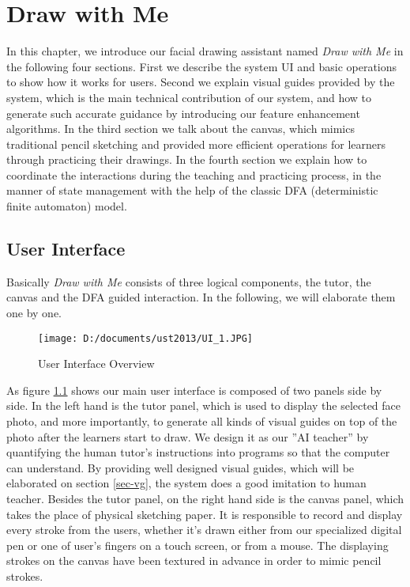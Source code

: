 \chapter{Draw with Me} \label{sec-mainwork}

		In this chapter, we introduce our facial drawing assistant named  \textit{Draw with Me}  in the following four sections. First we describe the system UI and basic operations to show how it works for users. Second we explain visual guides provided by the system, which is the main technical contribution of our system, and how to generate such accurate guidance by introducing our feature enhancement algorithms. In the third section we talk about the canvas, which mimics traditional pencil sketching and provided more efficient operations for learners through practicing their drawings. In the fourth section we explain how to coordinate the interactions during the teaching and practicing process, in the manner of state management with the help of the classic DFA (deterministic finite automaton) model.

\section{User Interface}

		Basically \textit{Draw with Me} consists of three logical components, the tutor, the canvas and the DFA guided interaction. In the following, we will elaborate them one by one. 
	
		\begin{figure}[htbp]
			\centering
				\texttt{[image: D:/documents/ust2013/UI\_1.JPG]}
			\caption{User Interface Overview}
			\label{fig:UI}
		\end{figure}
		
		
		As figure \ref{fig:UI} shows our main user interface is composed of two panels side by side. In the left hand is the tutor panel, which is used to display the selected face photo, and more importantly, to generate all kinds of visual guides on top of the photo after the learners start to draw. We design it as our ''AI teacher'' by quantifying the human tutor's instructions into programs so that the computer can understand. By providing well designed visual guides, which will be elaborated on section \ref{sec-vg}, the system does a good imitation to human teacher. Besides the tutor panel, on the right hand side is the canvas panel, which takes the place of physical sketching paper. It is responsible to record and display every stroke from the users, whether it's drawn either from our specialized digital pen or one of user's fingers on a touch screen, or from a mouse. The displaying strokes on the canvas have been textured in advance in order to mimic pencil strokes. 
		
